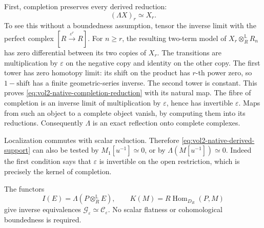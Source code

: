 First, completion preserves every derived reduction:
\begin{equation}\label{eq:vol2-native-completion-reduction}
                         (\Lambda X)_r\simeq X_r.
\end{equation}
To see this without a boundedness assumption, tensor the inverse limit
with the perfect complex \([R\xrightarrow{\varepsilon^r}R]\).
For \(n\geq r\), the resulting two-term model of
\(X_r\otimes_R^{\mathbb L}R_n\) has zero differential between its
two copies of \(X_r\). The transitions are multiplication by
\(\varepsilon\) on the negative copy and identity on the other copy.
The first tower has zero homotopy limit: its shift on the product has
\(r\)-th power zero, so \(1-\mathrm{shift}\) has a finite geometric-series
inverse. The second tower is constant. This proves
\eqref{eq:vol2-native-completion-reduction} with its natural map.
The fibre of completion is an inverse limit of multiplication by
\(\varepsilon\), hence has invertible \(\varepsilon\). Maps from such
an object to a complete object vanish, by computing them into its
reductions. Consequently \(\Lambda\) is an exact reflection onto
complete complexes.

Localization commutes with scalar reduction. Therefore
\eqref{eq:vol2-native-derived-support} can also be tested by
\(M_1[u^{-1}]\simeq0\), or by \(\Lambda(M[u^{-1}])\simeq0\).
Indeed the first condition says that \(\varepsilon\) is invertible on
the open restriction, which is precisely the kernel of completion.

\begin{theorem}\label{thm:vol2-native-normal-reconstruction}
The functors
\[
 I(E)=\Lambda(P\otimes_R^{\mathbb L}E),\qquad
 K(M)=R\operatorname{Hom}_{D_R}(P,M)
\]
give inverse equivalences
\(\mathcal G_\varepsilon\simeq\mathcal C_\varepsilon\).
No scalar flatness or cohomological boundedness is required.
\end{theorem}

